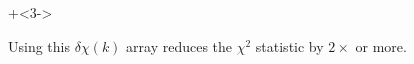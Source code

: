 \begin{frame}
\begin{cenpage}{135mm}
\begin{columns}
\begin{column}[T]{60mm}
      {}

    \end{column}

\end{columns}

\vmm

{\onslide+<3-> {

\begin{cenpage}{105mm}

    Using this $\delta\chi(k)$ array reduces the $\chi^2$
    statistic by $2\times$ or  more.

\end{cenpage}

}}

\end{cenpage}
\end{frame}

